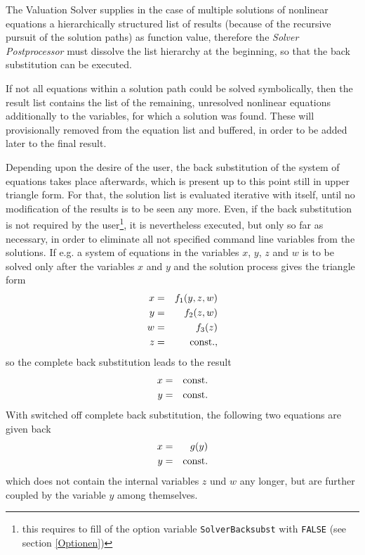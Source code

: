 
The Valuation Solver supplies in the case of multiple solutions of nonlinear equations a hierarchically structured list of results (because of the recursive pursuit of the solution paths) as function value, therefore  the {\em Solver Postprocessor} must dissolve  the list hierarchy at the beginning, so that the back substitution can be executed.

If not all equations within a solution path could be solved  symbolically, then the result list contains the list of the remaining, unresolved nonlinear equations additionally to the variables, for which a solution was found. These will provisionally removed from the equation list and buffered, in order to be added later to the final result.

Depending upon the desire of the user, the back substitution of the system of equations takes place afterwards, which is present up to this point still in upper triangle form. For that, the solution list is evaluated iterative with itself, until no modification of the results is to be seen any  more. Even, if the back substitution is not required by the user\footnote{this requires to fill of the option variable {\tt SolverBacksubst} with {\tt FALSE} (see section \ref{Optionen})}, it  is nevertheless executed, but only so far as necessary, in order to eliminate all not specified command line variables  from the solutions. If e.g. a system of equations
in the variables $x$, $y$, $z$ and $w$ is to be solved only after the variables $x$ and $y$  and the solution process gives  the triangle form
\begin{eqnarray}
x &=& f_1(y,z,w)\\
y &=& f_2(z,w)  \\
w &=& f_3(z)    \\
z &=& \mbox{const.},
\end{eqnarray}
so the complete back substitution leads to the result
\begin{eqnarray}
x &=& \mbox{const.} \\
y &=& \mbox{const.}
\end{eqnarray}
With switched off complete back substitution, the following two equations are given back 
\begin{eqnarray}
x &=& g(y) \\
y &=& \mbox{const.}
\end{eqnarray}
which does not contain the internal variables $z$ und $w$ any longer, but are further coupled by the variable $y$ among themselves.

